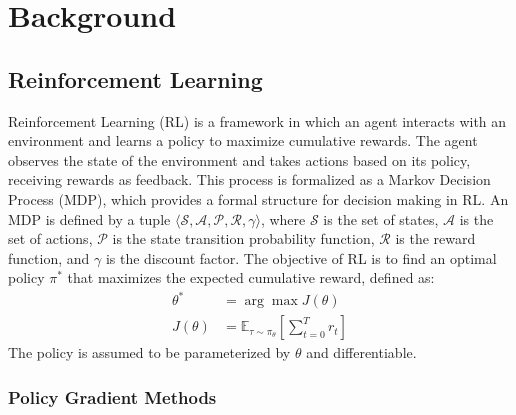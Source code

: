 
\chapter{Background}\label{chapter2}

\section{Reinforcement Learning}

Reinforcement Learning (RL) is a framework in which an agent interacts with an environment and learns a policy to maximize cumulative rewards.
The agent observes the state of the environment and takes actions based on its policy, receiving rewards as feedback.
This process is formalized as a Markov Decision Process (MDP), which provides a formal structure for decision making in RL.
An MDP is defined by a tuple $\langle \mathcal{S}, \mathcal{A}, \mathcal{P}, \mathcal{R}, \gamma \rangle$, where $\mathcal{S}$ is the set of states, $\mathcal{A}$ is the set of actions, $\mathcal{P}$ is the state transition probability function, $\mathcal{R}$ is the reward function, and $\gamma$ is the discount factor.
The objective of RL is to find an optimal policy $\pi^*$ that maximizes the expected cumulative reward, defined as:
\begin{equation}
  \begin{aligned}
    \theta^* &= \arg\max J(\theta) \\
    J(\theta) &= \mathbb{E}_{\tau \sim \pi_\theta} \left[\sum^T_{t = 0} r_t \right]
  \end{aligned}
\end{equation}
The policy is assumed to be parameterized by $\theta$ and differentiable.

\subsection{Policy Gradient Methods}

